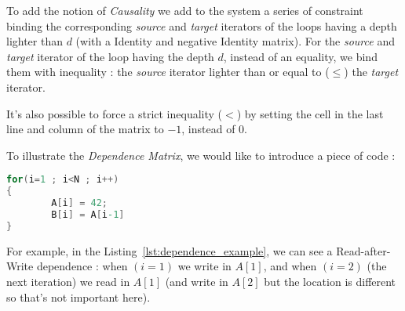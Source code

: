 \documentclass[paper=a4, fontsize=11.5pt]{scrartcl}
\numberwithin{equation}{section}        %
\numberwithin{figure}{section}          %
\numberwithin{table}{section}               %
\begin{document}
\begin{itemize}
                To add the notion of \textit{Causality} we add to the system a series of
                constraint binding the corresponding \textit{source} and \textit{target}
                iterators of the loops having a depth lighter than $d$
                (with a Identity and negative Identity matrix).
                For the \textit{source} and \textit{target} iterator of the loop having
                the depth $d$, instead of an equality, we bind them with inequality :
                the \textit{source} iterator lighter than or equal to ($\leq$) the \textit{target} iterator.

                It's also possible to force a strict inequality ($<$) by setting the cell
                in the last line and column of the matrix to $-1$, instead of $0$.
        \end{itemize}

        \medskip
        
        To illustrate the \textit{Dependence Matrix}, we would like to introduce a piece of code :
\begin{lstlisting}[frame=single, language=C, caption={Simple code for Dependence Relation example}, label={lst:dependence_example}]
for(i=1 ; i<N ; i++)
{
        A[i] = 42;
        B[i] = A[i-1]
}
\end{lstlisting}
        
        For example, in the Listing~\ref{lst:dependence_example}, we can see a Read-after-Write
        dependence : when $(i=1)$ we write in $A[1]$, and when $(i=2)$ (the next iteration)
        we read in $A[1]$ (and write in $A[2]$ but the location is different so that's not important here).
\end{document}
